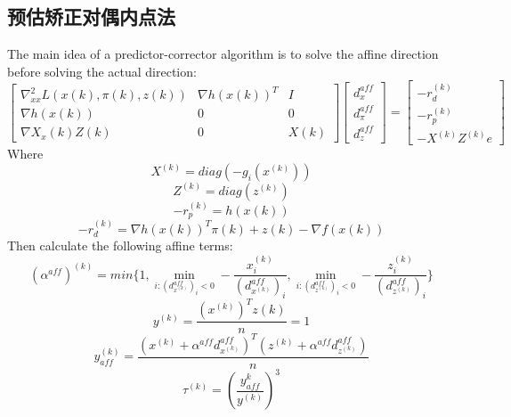 \subsection{预估矫正对偶内点法}
The main idea of a predictor-corrector algorithm is to solve the affine direction before solving the actual direction\parencite{Kwon}:
\begin{equation}\label{eq:chap4:affine}
\begin{bmatrix}
\nabla^2_{xx} L(x(k),\pi(k),z(k))     & \nabla h(x(k))^T    & I \\
\nabla h(x(k))     & 0     & 0 \\
\nabla X_x(k)Z(k)  & 0     &  X(k) 
\end{bmatrix}
\begin{bmatrix}
d_x^{aff}\\
d_\pi^{aff}\\
d_z^{aff}
\end{bmatrix}
=
\begin{bmatrix}
-r_d^{(k)}\\
-r_p^{(k)}\\
-X^{(k)}Z^{(k)}e
\end{bmatrix}
\end{equation}
Where
\begin{equation}
X^{(k)}=diag(-g_i(x^{(k)}))
\end{equation}
\begin{equation}
Z^{(k)}=diag(z^{(k)})
\end{equation}
\begin{equation}
-r_p^{(k)}=h(x(k))
\end{equation}
\begin{equation}
-r_d^{(k)}=\nabla {h(x(k))}^T \pi(k)+z(k)-\nabla f(x(k))
\end{equation}
Then calculate the following affine terms:
\begin{equation}\label{eq:chap4:affinealpha}
({\alpha}^{aff})^{(k)}=min\{1,\min_{i:{(d_{x^{(k)}}^{aff})}_i<0}-\frac{x_i^{(k)}}{{(d_{x^{(k)}}^{aff})}_i},\min_{i:{(d_{z^{(k)}}^{aff})}_i<0}-\frac{z_i^{(k)}}{{(d_{z^{(k)}}^{aff})}_i}\}
\end{equation}
\begin{equation}\label{eq:chap4:yk}
y^{(k)}=\frac{{(x^{(k)})}^Tz{(k)}}{n}=1
\end{equation}
\begin{equation}\label{eq:chap4:ykaffine}
y_{aff}^{(k)}=\frac{
	{(x^{(k)}+\alpha^{aff}d_{x^{(k)}}^{aff})}^T
	(z^{(k)}+\alpha^{aff}d_{z^{(k)}}^{aff})
}{n}
\end{equation}
\begin{equation}\label{eq:chap4:tauk}
\tau^{(k)}=({\frac{y^{k}_{aff}}{y^{(k)}}})^3
\end{equation}

